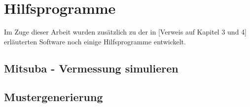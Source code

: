 
\chapter{Hilfsprogramme}{\label{Kap5}}

Im Zuge dieser Arbeit wurden zusätzlich zu der in [Verweis auf Kapitel 3 und 4] erläuterten Software noch einige Hilfsprogramme entwickelt. 

\section{Mitsuba - Vermessung simulieren}


\section{Mustergenerierung}






